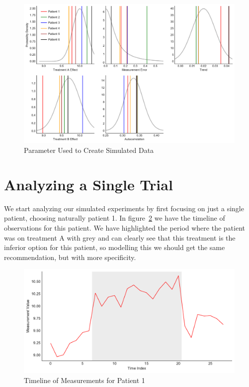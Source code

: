 \documentclass[12pt,a4paper,leqno]{report}
\theoremstyle{plain}
\theoremstyle{definition}
\theoremstyle{remark}
\begin{document}
\begin{figure}[H]
    \caption{Parameter Used to Create Simulated Data}\label{parameterdistribution}
    \bigskip
    \includegraphics[width=\textwidth,height=\textheight,keepaspectratio]{population_parameter_distributions.pdf}
\end{figure}

\section{Analyzing a Single Trial}\label{1trial}

We start analyzing our simulated experiments by first focusing on just a single patient,
choosing naturally patient 1. In figure\ \ref{patient1timeline} we have the timeline of
observations for this patient. We have highlighted the period where the patient was on treatment A with grey and can
clearly see that this treatment is the inferior option for this patient, so modelling
this we should get the same recommendation, but with more specificity.

\begin{figure}[H]
    \caption{Timeline of Measurements for Patient 1}\label{patient1timeline}
    \bigskip
    \includegraphics[width=\textwidth,height=\textheight,keepaspectratio]{patient1_timeline.pdf}
\end{figure}
\end{document}
